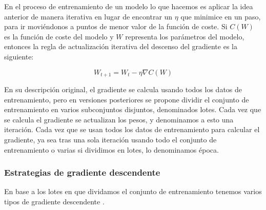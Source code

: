 En el proceso de entrenamiento de un modelo lo que hacemos es aplicar la idea anterior de manera iterativa en lugar de encontrar un $\eta$ que minimice en un paso, para ir moviéndonos a puntos de menor valor de la función de coste. Si $C(W)$ es la función de coste del modelo y $W$ representa los parámetros del modelo, entonces la regla de actualización iterativa del descenso del gradiente es la siguiente:

\begin{equation}\label{eq:GD}
W_{t+1}=W_t - \eta \nabla C(W)
\end{equation}

En su descripción original, el gradiente se calcula usando todos los datos de entrenamiento, pero en versiones posteriores se propone dividir el conjunto de entrenamiento en varios subconjuntos disjuntos, denominados lotes. Cada vez que se calcula el gradiente se actualizan los pesos, y denominamos a esto una iteración. Cada vez que se usan todos los datos de entrenamiento para calcular el gradiente, ya sea tras una sola iteración usando todo el conjunto de entrenamiento o varias si dividimos en lotes, lo denominamos época.



\subsubsection{Estrategias de gradiente descendente} \label{sec:estrategias}

En base a los lotes en que dividamos el conjunto de entrenamiento tenemos varios tipos de gradiente descendente \cite{GoodFellowBook}.

